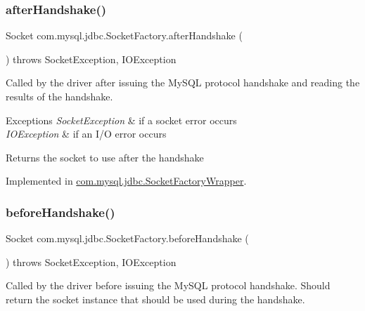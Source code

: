 \subsubsection{\texorpdfstring{after\+Handshake()}{afterHandshake()}}
{\footnotesize\ttfamily Socket com.\+mysql.\+jdbc.\+Socket\+Factory.\+after\+Handshake (\begin{DoxyParamCaption}{ }\end{DoxyParamCaption}) throws Socket\+Exception, I\+O\+Exception}

Called by the driver after issuing the My\+S\+QL protocol handshake and reading the results of the handshake.


\begin{DoxyExceptions}{Exceptions}
{\em Socket\+Exception} & if a socket error occurs \\
\hline
{\em I\+O\+Exception} & if an I/O error occurs\\
\hline
\end{DoxyExceptions}
\begin{DoxyReturn}{Returns}
the socket to use after the handshake 
\end{DoxyReturn}


Implemented in \mbox{\hyperlink{classcom_1_1mysql_1_1jdbc_1_1_socket_factory_wrapper_ab7dde0fd740255950d83759b418fd2ff}{com.\+mysql.\+jdbc.\+Socket\+Factory\+Wrapper}}.

\mbox{\label{interfacecom_1_1mysql_1_1jdbc_1_1_socket_factory_aa9a78553a76681f49c734aaa3f8f126b}} 
\subsubsection{\texorpdfstring{before\+Handshake()}{beforeHandshake()}}
{\footnotesize\ttfamily Socket com.\+mysql.\+jdbc.\+Socket\+Factory.\+before\+Handshake (\begin{DoxyParamCaption}{ }\end{DoxyParamCaption}) throws Socket\+Exception, I\+O\+Exception}

Called by the driver before issuing the My\+S\+QL protocol handshake. Should return the socket instance that should be used during the handshake.


